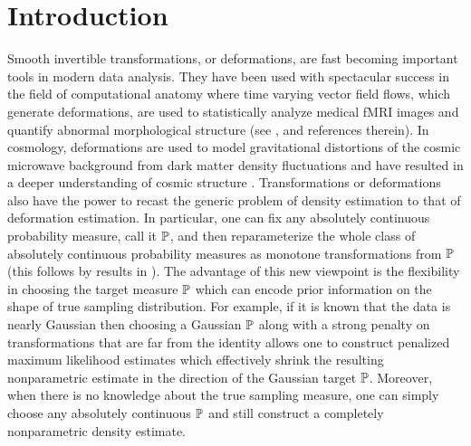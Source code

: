 \documentclass[noinfoline]{imsart}
\begin{document}
\section{Introduction}

\setcounter{page}{1}

  Smooth invertible transformations, or deformations, are fast becoming important tools in modern data analysis. 
  They have been used with spectacular success in the field of computational anatomy where time varying vector field flows, which generate deformations, are used to statistically analyze medical fMRI images and quantify abnormal morphological structure 
  (see  \cite{alla:07, 
 Beg:2006ly,  
 conf/miccai/BegMTY03,
  Beg:2005qf,  
   cao:05, 
   dup:98, 
 Grenander:1998:CAE:309082.309089,
 Miller:1999bh, 
 Miller:2006zr, 
 Miller:2001ve, 
 Trouve:1998ys,  
 ty:dq,  
 vaillant:04, 
you:10,
Younes:2008}, and references therein).
  In cosmology, deformations  are used to model gravitational distortions of the cosmic microwave background from  dark matter density fluctuations and have resulted in a deeper understanding of cosmic structure \cite{Das:2011uq}. 
Transformations or deformations also have the power  
 to recast the generic problem of density estimation to that of deformation estimation.  In particular, one can fix any absolutely continuous probability measure, call it $\Bbb P$, and then reparameterize the whole class of absolutely continuous probability measures as monotone transformations from $\Bbb P$ (this follows by results in \cite{mcc:95}).  The advantage of this new viewpoint is the flexibility in choosing the target measure $\Bbb P$ which can encode  prior information on the shape of true sampling distribution. 
 For example, if it is known that the data is nearly Gaussian then choosing a  Gaussian $\Bbb P$  along with a strong penalty on transformations that are far from the identity allows one to construct penalized maximum likelihood estimates which effectively shrink the resulting nonparametric estimate in the direction of the Gaussian target $\Bbb P$. Moreover, when there is no knowledge about the true sampling measure, one can simply choose any absolutely continuous $\Bbb P$ and still construct a completely nonparametric density estimate. 
\end{document}
